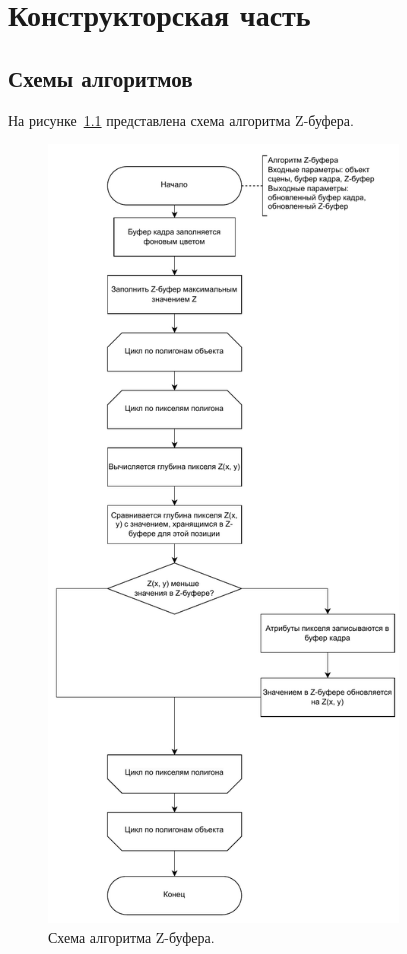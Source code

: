 \chapter{Конструкторская часть}

\section{Схемы алгоритмов}

На рисунке~\ref{images:Zbuffer} представлена схема алгоритма Z-буфера.

\begin{figure}[H]
    \centering
    \includegraphics[width=93mm]{images/Zbuffer}
    \caption{Схема алгоритма Z-буфера.}
    \label{images:Zbuffer}
\end{figure}

